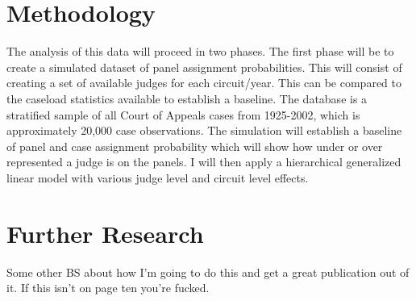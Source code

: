 \documentclass[12pt]{article}
\begin{document}
\section{Methodology}\label{Methods}
The analysis of this data will proceed in two phases. The first phase will be to create a simulated dataset of panel assignment probabilities. This will consist of creating a set of available judges for each circuit/year. This can be compared to the caseload statistics available to establish a baseline. The \citeauthor{Songer2007} database is a stratified sample of all Court of Appeals cases from 1925-2002, which is approximately 20,000 case observations. The simulation will establish a baseline of panel and case assignment probability which will show how under or over represented a judge is on the panels. I will then apply a hierarchical generalized linear model with various judge level and circuit level effects.

\section{Further Research}\label{Further Research}
Some other BS about how I'm going to do this and get a great publication out of it. If this isn't on page ten you're fucked.




\end{document}

